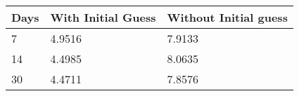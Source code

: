 \begin{tabular}{lll}
Days & With Initial Guess & Without Initial guess \\ 
\hline 
7 & 4.9516 & 7.9133 \\ 
14 & 4.4985 & 8.0635 \\ 
30 & 4.4711 & 7.8576 \\ 
\hline 
\end{tabular}